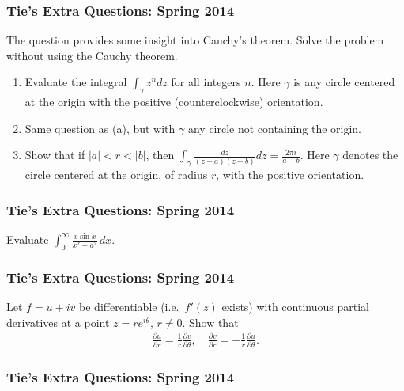 \hypertarget{ties-extra-questions-spring-2014}{%
\subsubsection{Tie's Extra Questions: Spring
2014}\label{ties-extra-questions-spring-2014}}

The question provides some insight into Cauchy's theorem. Solve the
problem without using the Cauchy theorem.

\begin{enumerate}
\def\labelenumi{\arabic{enumi}.}
\item
  Evaluate the integral \(\displaystyle{\int_{\gamma} z^n dz}\) for all
  integers \(n\). Here \(\gamma\) is any circle centered at the origin
  with the positive (counterclockwise) orientation.
\item
  Same question as (a), but with \(\gamma\) any circle not containing
  the origin.
\item
  Show that if \(|a|<r<|b|\), then
  \(\displaystyle{\int_{\gamma}\frac{dz}{(z-a)(z-b)} dz=\frac{2\pi i}{a-b}}\).
  Here \(\gamma\) denotes the circle centered at the origin, of radius
  \(r\), with the positive orientation.
\end{enumerate}

\hypertarget{ties-extra-questions-spring-2014-1}{%
\subsubsection{Tie's Extra Questions: Spring
2014}\label{ties-extra-questions-spring-2014-1}}

Evaluate
\(\displaystyle{ \int_{0}^{\infty}\frac{x\sin x}{x^2+a^2} \, dx }\).

\hypertarget{ties-extra-questions-spring-2014-2}{%
\subsubsection{Tie's Extra Questions: Spring
2014}\label{ties-extra-questions-spring-2014-2}}

Let \(f=u+iv\) be differentiable (i.e.~\(f'(z)\) exists) with continuous
partial derivatives at a point \(z=re^{i\theta}\), \(r\not= 0\). Show
that
\begin{align*}\frac{\partial u}{\partial r}=\frac{1}{r}\frac{\partial v}{\partial \theta},\quad
\frac{\partial v}{\partial r}=-\frac{1}{r}\frac{\partial u}{\partial \theta}.\end{align*}

\hypertarget{ties-extra-questions-spring-2014-3}{%
\subsubsection{Tie's Extra Questions: Spring
2014}\label{ties-extra-questions-spring-2014-3}}

